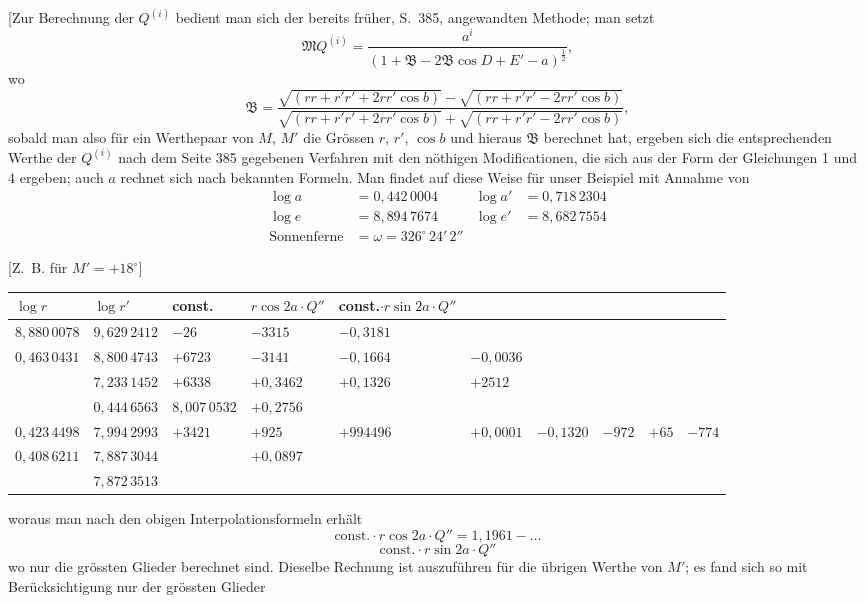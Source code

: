 \documentclass[12pt,a4paper]{article}
\begin{document}
[Zur Berechnung der $Q^{(i)}$ bedient man sich der bereits früher, S.~385, angewandten Methode; man setzt
\begin{equation}
\mathfrak{M}Q^{(i)} = \frac{a^i}{(1 + \mathfrak{B} - 2\mathfrak{B}\cos D + E' - a)^{\frac{1}{2}}},
\end{equation}
wo
\[\mathfrak{B} = \frac{\sqrt{(rr + r'r' + 2rr'\cos b)} - \sqrt{(rr + r'r' - 2rr'\cos b)}}{\sqrt{(rr + r'r' + 2rr'\cos b)} + \sqrt{(rr + r'r' - 2rr'\cos b)}},\]
sobald man also für ein Werthepaar von $M$, $M'$ die Grössen $r$, $r'$, $\cos b$ und hieraus $\mathfrak{B}$ berechnet hat, ergeben sich die entsprechenden Werthe der $Q^{(i)}$ nach dem Seite 385 gegebenen Verfahren mit den nöthigen Modificationen, die sich aus der Form der Gleichungen 1 und 4 ergeben; auch $a$ rechnet sich nach bekannten Formeln. Man findet auf diese Weise für unser Beispiel mit Annahme von
\begin{align*}
\log a &= 0{,}442\,0004 & \log a' &= 0{,}718\,2304\\
\log e &= 8{,}894\,7674 & \log e' &= 8{,}682\,7554\\
\text{Sonnenferne} &= \omega = 326^\circ\,24'\,2''
\end{align*}

\newpage
\setcounter{page}{415}
%
[Z.~B. für $M' = +18^\circ$]

\begin{center}
\begin{tabular}{l@{\quad}l@{\quad}l@{\quad}l}
\toprule
$\log r$ & $\log r'$ & const. & $r\cos 2a \cdot Q''$ & const.$\cdot r\sin 2a \cdot Q''$ \\
\midrule
$8{,}880\,0078$ & $9{,}629\,2412$ & $-26$ & $-3315$ & $-0{,}3181$ \\
$0{,}463\,0431$ & $8{,}800\,4743$ & $+6723$ & $-3141$ & $-0{,}1664$ & $-0{,}0036$ \\
& $7{,}233\,1452$ & $+6338$ & $+0{,}3462$ & $+0{,}1326$ & $+2512$ \\
& $0{,}444\,6563$ & $8{,}007\,0532$ & $+0{,}2756$\\
$0{,}423\,4498$ & $7{,}994\,2993$ & $+3421$ & $+925$ & $+994496$ & $+0{,}0001$ & $-0{,}1320$ & $-972$ & $+65$ & $-774$\\
$0{,}408\,6211$ & $7{,}887\,3044$ & & $+0{,}0897$\\
& $7{,}872\,3513$ & & \\
\bottomrule
\end{tabular}
\end{center}
woraus man nach den obigen Interpolationsformeln erhält
\[\text{const.} \cdot r \cos 2a \cdot Q'' = 1{,}1961 - \ldots\]
\[\text{const.} \cdot r \sin 2a \cdot Q''\]
wo nur die grössten Glieder berechnet sind. Dieselbe Rechnung ist auszuführen für die übrigen Werthe von $M'$; es fand sich so mit Berücksichtigung nur der grössten Glieder
\end{document}
